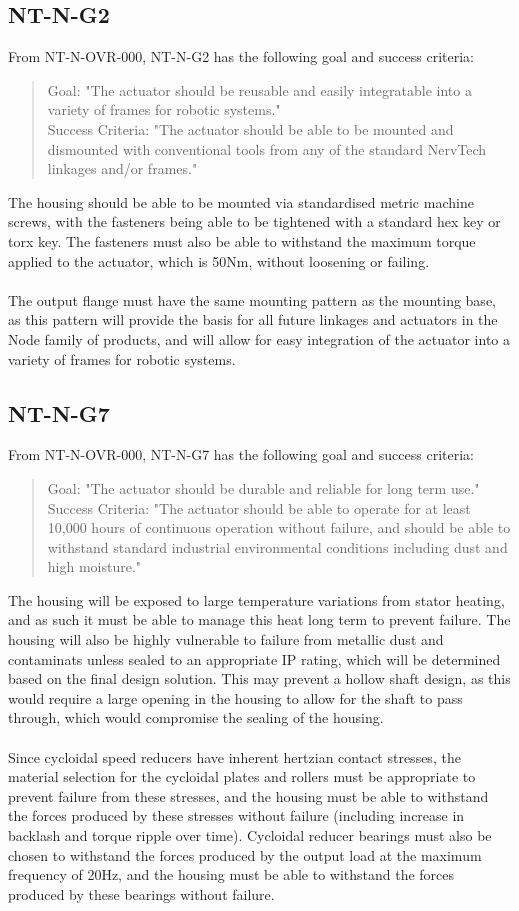 \documentclass[confidential]{../../../classes/nervtech-engdoc}
\begin{document}
\subsection{NT-N-G2}
From NT-N-OVR-000, NT-N-G2 has the following goal and success criteria:
\begin{quote}
  Goal: "The actuator should be reusable and easily integratable into a variety of frames for robotic systems."
  \\
  Success Criteria: "The actuator should be able to be mounted and dismounted with conventional tools from any of the standard NervTech linkages and/or frames."
\end{quote}
The housing should be able to be mounted via standardised metric machine screws, with the fasteners being able to be tightened with a standard hex key or torx key.
The fasteners must also be able to withstand the maximum torque applied to the actuator, which is 50Nm, without loosening or failing.
\\\\
The output flange must have the same mounting pattern as the mounting base, as this pattern will provide the basis for all future linkages and actuators in the Node family of products, and will allow for easy integration of the actuator into a variety of frames for robotic systems.
\subsection{NT-N-G7}
From NT-N-OVR-000, NT-N-G7 has the following goal and success criteria:
\begin{quote}
  Goal: "The actuator should be durable and reliable for long term use."
  \\
  Success Criteria: "The actuator should be able to operate for at least 10,000 hours of continuous operation without failure, and should be able to withstand standard industrial environmental conditions including dust and high moisture."
\end{quote}
The housing will be exposed to large temperature variations from stator heating, and as such it must be able to manage this heat long term to prevent failure.
The housing will also be highly vulnerable to failure from metallic dust and contaminats unless sealed to an appropriate IP rating, which will be determined based on the final design solution.
This may prevent a hollow shaft design, as this would require a large opening in the housing to allow for the shaft to pass through, which would compromise the sealing of the housing.
\\\\
Since cycloidal speed reducers have inherent hertzian contact stresses, the material selection for the cycloidal plates and rollers must be appropriate to prevent failure from these stresses, and the housing must be able to withstand the forces produced by these stresses without failure (including increase in backlash and torque ripple over time).
Cycloidal reducer bearings must also be chosen to withstand the forces produced by the output load at the maximum frequency of 20Hz, and the housing must be able to withstand the forces produced by these bearings without failure.
\end{document}
